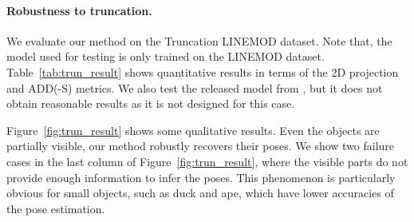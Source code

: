 \documentclass[10pt,twocolumn,letterpaper]{article}
\begin{document}
\begin{table}
\begin{center}
\end{center}
	\vspace{-0.2mm}
\caption{Our results on the \textbf{Truncation LINEMOD} dataset in terms of the \textbf{2D projection} and the \textbf{ADD(-S)} metrics.}
	\vspace{-4mm}
\label{tab:trun_result}
\end{table}\paragraph{Robustness to truncation.} We evaluate our method on the Truncation LINEMOD dataset. Note that, the model used for testing is only trained on the LINEMOD dataset. Table~\ref{tab:trun_result} shows quantitative results in terms of the 2D projection and ADD(-S) metrics. We also test the released model from \cite{tekin2018real}, but it does not obtain reasonable results as it is not designed for this case.

Figure~\ref{fig:trun_result} shows some qualitative results. Even the objects are partially visible, our method robustly recovers their poses. We show two failure cases in the last column of Figure~\ref{fig:trun_result}, where the visible parts do not provide enough information to infer the poses. 
This phenomenon is particularly obvious for small objects, such as duck and ape, which have lower accuracies of the pose estimation.
\end{document}

